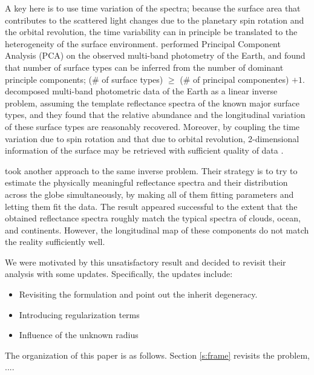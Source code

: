\documentclass[iop,numberedappendix,apj,]{emulateapj}
\begin{document}
A key here is to use time variation of the spectra; because the surface area that contributes to the scattered light changes due to the planetary spin rotation and the orbital revolution, the time variability can in principle be translated to the heterogeneity of the surface environment.  
\citet{Cowan2009, Cowan2011} performed Principal Component Analysis (PCA) on the observed multi-band photometry of the Earth, and found that number of surface types can be inferred from the number of dominant principle components; (\# of surface types) $\ge $ (\# of principal componentes) $+ 1$. %
\citet{Fujii2010, Fujii2011} decomposed multi-band photometric data of the Earth as a linear inverse problem, assuming the template reflectance spectra of the known major surface types, and they found that the relative abundance and the longitudinal variation of these surface types are reasonably recovered. 
Moreover, by coupling the time variation due to spin rotation and that due to orbital revolution, 2-dimensional information of the surface may be retrieved with sufficient quality of data \citep{Kawahara2010, Kawahara2011, Fujii2012}. 

\citet{Cowan2013} took another approach to the same inverse problem. 
Their strategy is to try to estimate the physically meaningful reflectance spectra and their distribution across the globe simultaneously, by making all of them fitting parameters and letting them fit the data. 
The result appeared successful to the extent that the obtained reflectance spectra roughly match the typical spectra of clouds, ocean, and continents. 
However, the longitudinal map of these components do not match the reality sufficiently well. 

We were motivated by this unsatisfactory result and decided to revisit their analysis with some updates. 
Specifically, the updates include:
\begin{itemize}
\item Revisiting the formulation and point out the inherit degeneracy. 
\item Introducing regularization terms
\item Influence of the unknown radius
\end{itemize}

The organization of this paper is as follows. 
Section \ref{s:frame} revisits the problem, ....

\newpage

\end{document}
